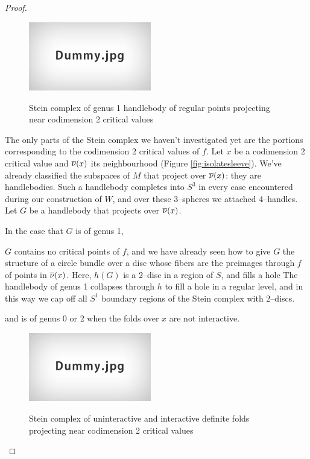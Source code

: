 \begin{proof}
	\begin{figure}
		\centering
		\captionsetup{justification=centering}
		\caption{Stein complex of genus 1 handlebody of regular points projecting near codimension 2 critical values}
		\includegraphics[height=3cm]{figures/dummy.jpg}
		\label{fig:codim2steinregular}
	\end{figure}
	
	The only parts of the Stein complex we haven't investigated yet are the portions corresponding to the codimension 2 critical values of $f$.
	Let $x$ be a codimension 2 critical value and $\overline{\nu}(x)$ its neighbourhood (Figure \ref{fig:isolatesleeve}).
	We've already classified the subspaces of $M$ that project over $\overline{\nu}(x)$: they are handlebodies.
	Such a handlebody completes into $S^3$ in every case encountered during our construction of $W$, and over these 3--spheres we attached 4--handles.
	Let $G$ be a handlebody that projects over $\overline{\nu}(x)$.
												
													In the case that $G$ is of genus 1, 
													
													$G$ contains no critical points of $f$, and we have already seen how to give $G$ the structure of a circle bundle over a disc whose fibers are the preimages through $f$ of points in $\overline{\nu}(x)$.
													Here, $h(G)$ is a 2--disc in a region of $S$, and fills a hole 
													The handlebody of genus 1 collapses through $h$ to fill a hole in a regular level, and in this way we cap off all $S^1$ boundary regions of the Stein complex with 2--discs.
													
													 and is of genus 0 or 2 when the folds over $x$ are not interactive.
												
													
													\begin{figure}
														\centering
														\captionsetup{justification=centering}
														\caption{Stein complex of uninteractive and interactive definite folds projecting near codimension 2 critical values}
														\includegraphics[height=3cm]{figures/dummy.jpg}
														\label{fig:codim2steindef}
													\end{figure}
													

\end{proof}
